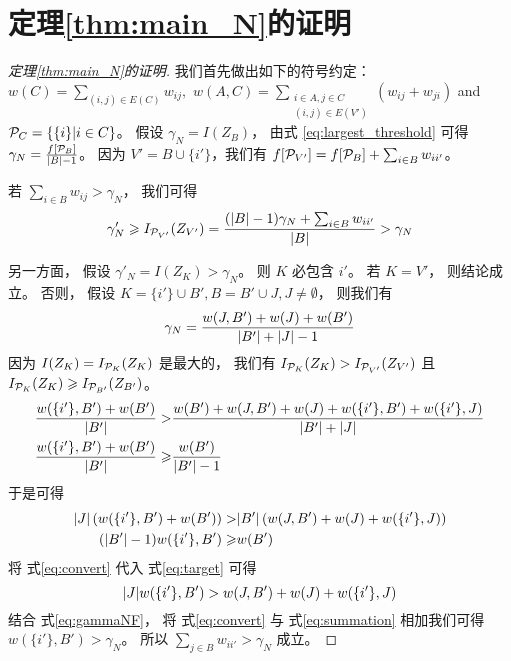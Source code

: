 \section{定理\ref{thm:main_N}的证明}
    \begin{proof}[定理\ref{thm:main_N}的证明]
      我们首先做出如下的符号约定：
      $w(C) = \displaystyle\sum_{(i,j) \in E(C)} w_{ij},$
      $w(A, C) = \displaystyle\sum_{\substack{i \in A, j \in C \\ (i,j) \in E(V')}} (w_{ij}+w_{ji})$ and
      $\P_C = \{\{i \}| i \in C \}$。
      假设 $\gamma_N = I(Z_B)$，
      由式 \eqref{eq:largest_threshold} 可得
      $\gamma_N =\frac{f[\P_B]} {\abs{B} -1}$。
      因为 $V' = B \cup \{i'\}$，我们有
      $f[\P_{V'}] = f[\P_B] + \sum_{i \in B}w_{ii'}$。
      
      若 $ \sum_{i \in B} w_{ij} > \gamma_N$， 我们可得
      $$
      \gamma'_N \geq I_{\P_{V'}}(Z_{V'}) = \frac{(\abs{B}-1)\gamma_N
      + \sum_{i \in B}w_{ii'}}{\abs{B}} > \gamma_N
      $$
      
      另一方面， 假设 
      $\gamma'_N = I(Z_K) > \gamma_N$。 则 $K$ 必包含 $i'$。
      若 $K=V'$， 则结论成立。
      否则， 假设 $K = \{i'\} \cup B', B=B'\cup J, J\neq \emptyset$，
      则我们有
      \begin{equation}\label{eq:gammaNF}
      \gamma_N = \frac{w(J,B') + w(J) + w(B')}{ \abs{B'} + \abs{J} - 1 }
      \end{equation}
      因为 $I(Z_K) = I_{\P_K}(Z_K)$ 是最大的，
      我们有 $I_{\P_K}(Z_K) > I_{\P_{V'}}(Z_{V'})$ 且
      $I_{\P_K}(Z_K) \geq I_{\P_{B'}}(Z_{B'})$。
      \begin{align*}
      \frac{w(\{i'\}, B') + w(B')}{\abs{B'}} >& \frac{w(B') + w(J, B') + w(J) + w(\{i'\}, B') + w(\{i'\}, J)}{\abs{B'} + \abs{J}}  \\
      \frac{w(\{i'\}, B') + w(B')}{\abs{B'}} \geq & \frac{w(B')}{\abs{B'} - 1}
      \end{align*}
      于是可得
      \begin{align}
      \abs{J} \left(w(\{i'\}, B') + w(B') \right) > &
      \abs{B'} \left(w(J, B') + w(J) + w(\{i'\}, J) \right)
      \label{eq:target}
      \\
      (\abs{B'} - 1)  w(\{i'\}, B') \geq & w(B') \label{eq:convert}
      \end{align}
      将 式\eqref{eq:convert} 代入 式\eqref{eq:target} 可得
      \begin{equation}\label{eq:summation}
      \abs{J} w(\{i'\}, B') > w(J, B') + w(J) + w(\{i'\}, J)
      \end{equation}
      结合 式\eqref{eq:gammaNF}，
      将 式\eqref{eq:convert} 与 式\eqref{eq:summation} 相加我们可得
      $w(\{i'\}, B') > \gamma_N$。
      所以 $\sum_{j \in B}w_{ii'} > \gamma_N $ 成立。
    \end{proof}
  
